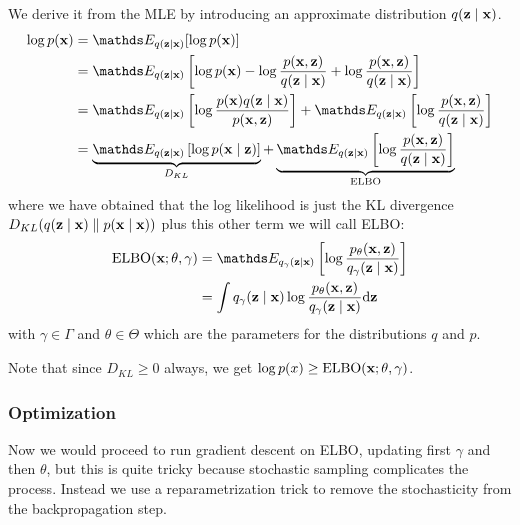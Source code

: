 \documentclass[12pt]{extarticle}
\renewcommand{\vec}[1]{\bvec{#1}}
\begin{document}
We derive it from the MLE by introducing an approximate distribution $q(\vec z \mid \vec x)$.
\begin{align}
	\log p(\vec x) & = \E_{q(\vec z \mid \vec x)}[\log p(\vec x)]                                                             \\
	               & = \E_{q(\vec z \mid \vec x)}\left[ \log p(\vec x) - \log \frac{p(\vec x, \vec z)}{q(\vec z \mid \vec x)}
	+ \log \frac{p(\vec x, \vec z)}{q(\vec z \mid \vec x)}\right]                                                             \\
	               & = \E_{q(\vec z \mid \vec x)}\left[ \log \frac{p(\vec x)q(\vec z \mid \vec x)}{p(\vec x, \vec z)} \right]
	+ \E_{q(\vec z \mid \vec x)}\left[\log \frac{p(\vec x, \vec z)}{q(\vec z \mid \vec x)}\right]                             \\
	               & = \underbrace{\E_{q(\vec z \mid \vec x)}\left[ \log {p(\vec x \mid \vec z)} \right]}_{D_{KL}}
	+ \underbrace{\E_{q(\vec z \mid \vec x)}\left[\log \frac{p(\vec x, \vec z)}{q(\vec z \mid \vec x)}\right]}_{\mathrm{ELBO}}
\end{align}
where we have obtained that the log likelihood is just the KL divergence
$D_{KL}(q(\vec z \mid \vec x) \parallel p(\vec x \mid \vec x))$ plus this other term we will call
ELBO:
\begin{align}
	\mathrm{ELBO}(\vec x; \theta, \gamma) & =
	\E_{q_\gamma(\vec z \mid \vec x)}\left[\log \frac{p_\theta(\vec x, \vec z)}{q_\gamma(\vec z \mid \vec x)}\right] \\
	                                      & =
	\int q_\gamma(\vec z \mid \vec x) \log \frac{p_\theta(\vec x, \vec z)}{q_\gamma(\vec z \mid \vec x)} \dd \vec z
\end{align}
with $\gamma \in \Gamma$ and $\theta \in \Theta$ which are the parameters for the distributions $q$
and $p$.

Note that since $D_{KL} \geq 0$ always, we get
$\log p(x) \geq \mathrm{ELBO}(\vec x; \theta, \gamma)$.

\subsubsection{Optimization}

Now we would proceed to run gradient descent on ELBO, updating first $\gamma$ and then $\theta$,
but this is quite tricky because stochastic sampling complicates the process.
Instead we use a reparametrization trick to remove the stochasticity from the backpropagation step.
\end{document}
